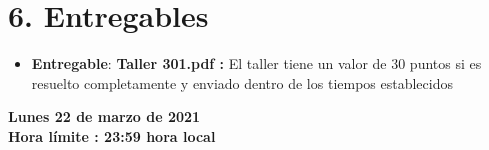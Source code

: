 \documentclass[base=hide,11pt]{elegantbook}
\begin{document}
\section*{6. Entregables}

\begin{itemize}
\item {\bf Entregable}: \textcolor{col1}{\bf Taller 301.pdf :} El taller tiene un valor de 30 puntos si es resuelto completamente y enviado dentro de los tiempos establecidos
\end{itemize}
\vspace{1cm}

\textcolor{col1}{\bf Lunes 22 de marzo de 2021}\\
\textcolor{col1}{\bf Hora límite : 23:59  hora  local}



\end{document}

